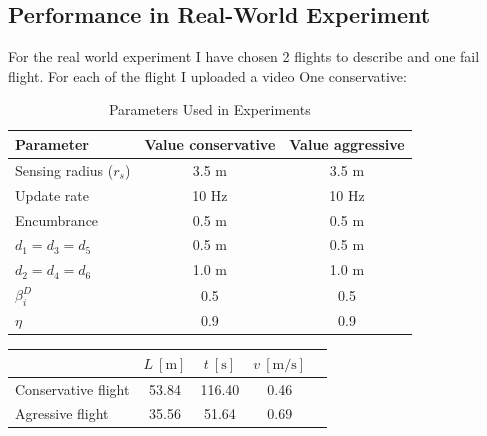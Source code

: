         
        \subsection{Performance in Real-World Experiment}
            For the real world experiment I have chosen 2 flights to describe and one fail flight. For each of the flight I uploaded a video One conservative:
            \begin{table}[H]
                \centering
                \caption{Parameters Used in Experiments}
                \begin{tabular}{|l|c|c|}
                    \hline
                    Parameter & Value conservative & Value aggressive \\
                    \hline
                    \hline
                    Sensing radius ($r_s$) & 3.5 m & 3.5 m \\ \hline
                    Update rate & 10 Hz & 10 Hz \\ \hline
                    Encumbrance & 0.5 m & 0.5 m \\ \hline
                    $d_1 = d_3 = d_5$ & 0.5 m & 0.5 m \\ \hline
                    $d_2 = d_4 = d_6$ & 1.0 m & 1.0 m\\ \hline
                    $\beta_i^D$ & 0.5 & 0.5 \\ \hline
                    $\eta$ & 0.9 & 0.9 \\ \hline
                \end{tabular}
                \label{tab:rbl_forest_conservative_flight}
            \end{table}

            \begin{table}[H]
                \centering
                \renewcommand{\arraystretch}{1.2}
                \begin{tabular}{|l|c|c|c|c|}
                \hline
                                    & \( L \ [\mathrm{m}] \) & \( t \ [\mathrm{s}] \) &  \( v \ [\mathrm{m/s}] \)     \\ \hline
                Conservative flight & 53.84                   & 116.40                  &  0.46                          \\ \hline
                Agressive flight    & 35.56                   &  51.64                  &  0.69                          \\ \hline
                \end{tabular}
            \end{table}


